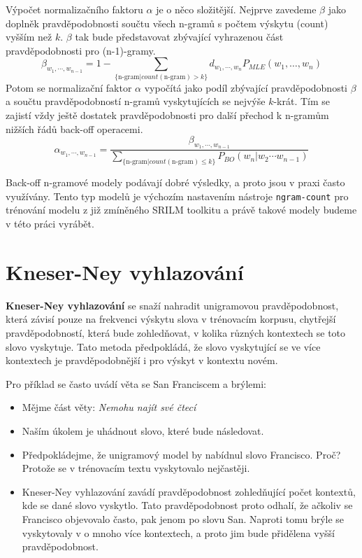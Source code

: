 \documentclass[12pt,a4paper]{report}
\begin{document}
Výpočet normalizačního faktoru $\alpha$ je o něco složitější. Nejprve zavedeme $\beta$ jako doplněk pravděpodobnosti součtu všech n-gramů s počtem výskytu (count) vyšším než $k$. $\beta$ tak bude představovat zbývající vyhrazenou část pravděpodobnosti pro (n-1)-gramy.
\begin{equation}
\beta_{w_{1}, \cdots, w_{n-1}} = 1 - \sum_{ \{\text{n-gram} | count(\text{n-gram}) > k \} } d_{w_{1}, \cdots, w_{n}} P_{MLE}(w_1, \ldots, w_n)
\end{equation}
Potom se normalizační faktor $\alpha$ vypočítá jako podíl zbývající pravděpodobnosti $\beta$ a součtu pravděpodobností n-gramů vyskytujících se nejvýše $k$-krát. Tím se zajistí vždy ještě dostatek pravděpodobnosti pro další přechod k n-gramům nižších řádů back-off operacemi.
\begin{equation}
\alpha_{w_{1}, \cdots, w_{n -1}} = \frac{\beta_{w_{1}, \cdots, w_{n -1}}}        {\sum_{ \{ \text{n-gram} | count(\text{n-gram}) \leq k \} } P_{BO}(w_n | w_{2} \cdots w_{n-1})}
\end{equation}

Back-off n-gramové modely podávají dobré výsledky, a proto jsou v praxi často využívány. Tento typ modelů je výchozím nastavením nástroje \texttt{ngram-count} pro trénování modelu z již zmíněného SRILM toolkitu a právě takové modely budeme v této práci vyrábět.

\section{Kneser-Ney vyhlazování}
\textbf{Kneser-Ney vyhlazování} se snaží nahradit unigramovou pravděpodobnost, která závisí pouze na frekvenci výskytu slova v trénovacím korpusu, chytřejší pravděpodobností, která bude zohledňovat, v kolika různých kontextech se toto slovo vyskytuje. Tato metoda předpokládá, že slovo vyskytující se ve více kontextech je pravděpodobnější i pro výskyt v kontextu novém.

Pro příklad se často uvádí věta se San Franciscem a brýlemi:
\begin{itemize}
\item{Mějme část věty: \textit{Nemohu najít své čtecí}}
\item{Naším úkolem je uhádnout slovo, které bude následovat.}
\item{Předpokládejme, že unigramový model by nabídnul slovo Francisco. Proč? Protože se v trénovacím textu vyskytovalo nejčastěji.}
\item{Kneser-Ney vyhlazování zavádí pravděpodobnost zohledňující počet kontextů, kde se dané slovo vyskytlo. Tato pravděpodobnost proto odhalí, že ačkoliv se Francisco objevovalo často, pak jenom po slovu San. Naproti tomu brýle se vyskytovaly v o mnoho více kontextech, a proto jim bude přidělena vyšší pravděpodobnost.}
\end{itemize}
\end{document}
